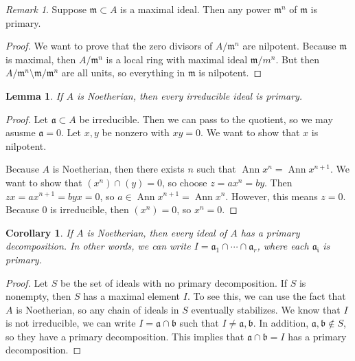 \documentclass[leqno, openany]{memoir}
\newtheorem{cor}[thm]{Corollary}
\newtheorem{lem}[thm]{Lemma}
\theoremstyle{definition}
\theoremstyle{remark}
\newtheorem{rmk}[thm]{Remark}
\theoremstyle{plain}
\theoremstyle{definition}
\theoremstyle{remark}
\newcommand{\mf}[1]{\mathfrak{#1}}
\begin{document}
\begin{rmk}
    Suppose $\mf{m} \subset A$ is a maximal ideal. Then any power $\mf{m}^n$ of $\mf{m}$ is primary.
\end{rmk}

\begin{proof}
    We want to prove that the zero divisors of $A / \mf{m}^n$ are nilpotent. Because $\mf{m}$ is maximal, then $A / \mf{m}^n$ is a local ring with maximal ideal $\mf{m} / m^n$. But then $A / \mf{m}^n \setminus \mf{m} / \mf{m}^n$ are all units, so everything in $\mf{m}$ is nilpotent.
\end{proof}

\begin{lem}
    If $A$ is Noetherian, then every irreducible ideal is primary.
\end{lem}

\begin{proof}
    Let $\mf{a} \subset A$ be irreducible. Then we can pass to the quotient, so we may asusme $\mf{a} = 0$. Let $x,y$ be nonzero with $xy = 0$. We want to show that $x$ is nilpotent.

    Because $A$ is Noetherian, then there exists $n$ such that $\operatorname{Ann} x^n = \operatorname{Ann} x^{n+1}$. We want to show that $(x^n) \cap (y) = 0$, so choose $z = ax^n = by$. Then $zx = ax^{n+1} = byx = 0$, so $a \in \operatorname{Ann} x^{n+1} = \operatorname{Ann} x^n$. However, this means $z = 0$. Because $0$ is irreducible, then $(x^n) = 0$, so $x^n = 0$.
\end{proof}

\begin{cor}
    If $A$ is Noetherian, then every ideal of $A$ has a primary decomposition. In other words, we can write $I = \mf{a}_1 \cap  \cdots \cap \mathfrak{a}_r$, where each $\mf{a_i}$ is primary. 
\end{cor}

\begin{proof}
    Let $S$ be the set of ideals with no primary decomposition. If $S$ is nonempty, then $S$ has a maximal element $I$. To see this, we can use the fact that $A$ is Noetherian, so any chain of ideals in $S$ eventually stabilizes. We know that $I$ is not irreducible, we can write $I = \mf{a} \cap \mathfrak{b}$ such that $I \neq \mf{a}, \mf{b}$. In addition, $\mf{a}, \mf{b} \notin S$, so they have a primary decomposition. This implies that $\mf{a} \cap \mf{b} = I$ has a primary decomposition.
\end{proof}
\end{document}
